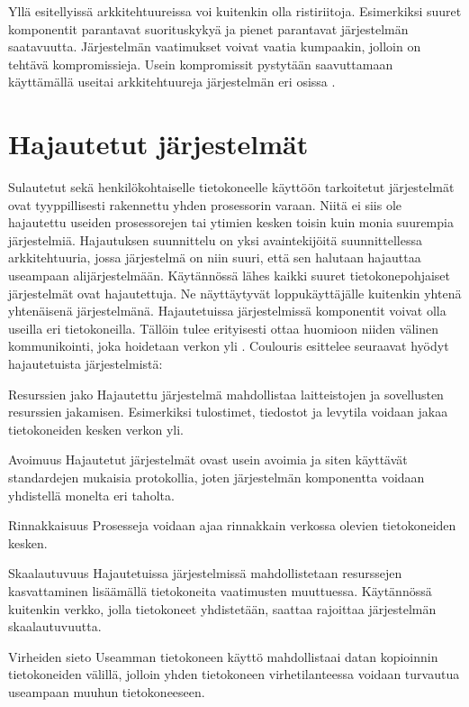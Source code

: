 \documentclass[utf8]{gradu3}
\begin{document}
Yllä esitellyissä arkkitehtuureissa voi kuitenkin olla ristiriitoja. Esimerkiksi suuret komponentit parantavat suorituskykyä  ja pienet parantavat järjestelmän saatavuutta. Järjestelmän vaatimukset voivat vaatia kumpaakin, jolloin on tehtävä kompromissieja. Usein kompromissit pystytään saavuttamaan käyttämällä useitai arkkitehtuureja järjestelmän eri osissa \parencite[s.152]{Sommerville}. 

\pagebreak

\section{Hajautetut järjestelmät}
Sulautetut sekä henkilökohtaiselle tietokoneelle käyttöön tarkoitetut järjestelmät ovat tyyppillisesti rakennettu yhden prosessorin varaan. Niitä ei siis ole hajautettu useiden prosessorejen tai ytimien kesken toisin kuin monia suurempia järjestelmiä. Hajautuksen suunnittelu on yksi avaintekijöitä suunnittellessa arkkitehtuuria, jossa järjestelmä on niin suuri, että sen halutaan hajauttaa useampaan alijärjestelmään. Käytännössä lähes kaikki suuret tietokonepohjaiset järjestelmät ovat hajautettuja. Ne näyttäytyvät loppukäyttäjälle kuitenkin yhtenä yhtenäisenä järjestelmänä. Hajautetuissa järjestelmissä komponentit voivat olla useilla eri tietokoneilla. Tällöin tulee erityisesti ottaa huomioon niiden välinen kommunikointi, joka hoidetaan verkon yli \parencite[s. 480]{Sommerville}. Coulouris \parencite{Coulouris} esittelee seuraavat hyödyt hajautetuista järjestelmistä:


\begin{desclist}
\item[Resurssien jako] Hajautettu järjestelmä mahdollistaa laitteistojen ja sovellusten resurssien jakamisen. Esimerkiksi tulostimet, tiedostot ja levytila voidaan jakaa tietokoneiden kesken verkon yli.
\item[Avoimuus] Hajautetut järjestelmät ovast usein avoimia ja siten käyttävät standardejen mukaisia protokollia, joten järjestelmän komponentta voidaan yhdistellä monelta eri taholta.  
\item[Rinnakkaisuus] Prosesseja voidaan ajaa rinnakkain verkossa olevien tietokoneiden kesken.
\item[Skaalautuvuus] Hajautetuissa järjestelmissä mahdollistetaan resurssejen kasvattaminen lisäämällä tietokoneita vaatimusten muuttuessa. Käytännössä kuitenkin verkko, jolla tietokoneet yhdistetään, saattaa rajoittaa järjestelmän skaalautuvuutta.
\item[Virheiden sieto] Useamman tietokoneen käyttö mahdollistaai datan kopioinnin tietokoneiden välillä, jolloin yhden tietokoneen virhetilanteessa voidaan turvautua useampaan muuhun tietokoneeseen. 
\end{desclist}
\end{document}
